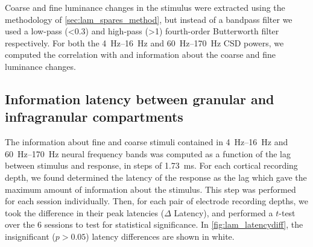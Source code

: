 Coarse and fine luminance changes in the stimulus were extracted using the methodology of \autoref{sec:lam_spares_method}, but instead of a bandpass filter we used a low-pass (\SI{<0.3}{\cpd}) and high-pass (\SI{>1}{\cpd}) fourth-order Butterworth filter respectively.
For both the \SIrange{4}{16}{Hz} and \SIrange{60}{170}{Hz} \ac{CSD} powers, we computed the correlation with and information about the coarse and fine luminance changes.


\subsection{Information latency between granular and infragranular compartments}

The information about fine and coarse stimuli contained in \SIrange{4}{16}{Hz} and \SIrange{60}{170}{Hz} neural frequency bands was computed as a function of the lag between stimulus and response, in steps of \SI{1.73}{\milli\second}.
For each cortical recording depth, we found determined the latency of the response as the lag which gave the maximum amount of information about the stimulus.
This step was performed for each session individually.
%
Then, for each pair of electrode recording depths, we took the difference in their peak latencies ($\Delta$ Latency), and performed a $t$-test over the \num{6} sessions to test for statistical significance.
In \autoref{fig:lam_latencydiff}, the insignificant ($p>0.05$) latency differences are shown in white.
%



